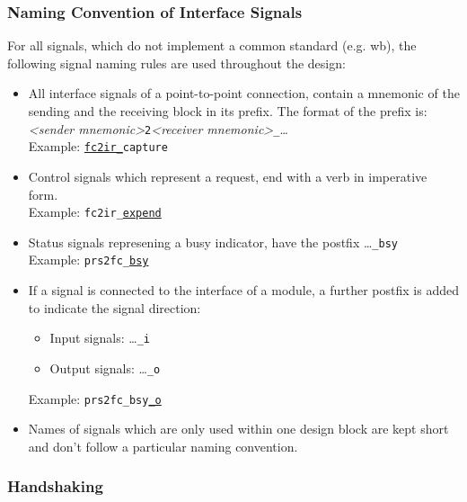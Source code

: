 \subsubsection{Naming Convention of Interface Signals}
\label{architecture:principles:naming}

For all signals, which do not implement a common standard (e.g. \gls{wb}),
the following signal naming rules are used throughout the design:
\begin{itemize}

\item   
All interface signals of a point-to-point connection, contain a mnemonic of the sending and the receiving block in its prefix.
The format of the prefix is: \\
\emph{\textless sender mnemonic\textgreater}\texttt{2}\emph{\textless receiver mnemonic\textgreater }\texttt{\_}\dots \\
Example: \texttt{\underline{fc2ir\_}capture}

\item   
Control signals which represent a request, end with a verb in imperative form. \\
Example: \texttt{fc2ir\_\underline{expend}}

\item   
Status signals represening a busy indicator, have the postfix \dots\texttt{\_bsy} \\
Example: \texttt{prs2fc\_\underline{bsy}}

\item   
If a signal is connected to the interface of a module, a further postfix is added to indicate the signal direction:
  \begin{itemize}
    \item   
    Input signals: \dots\texttt{\_i} \\
    \item   
    Output signals: \dots\texttt{\_o} \\
  \end{itemize}
Example: \texttt{prs2fc\_bsy\underline{\_o}}
  
\item   
Names of signals which are only used within one design block are kept short and don't follow a particular naming convention.

\end{itemize}

\subsubsection{Handshaking}
\label{architecture:principles:handshakes}

